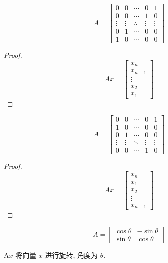 \begin{example}[反转矩阵]
    $$ A=\left[\begin{array}{ccccc}0 & 0 & \cdots & 0 & 1 \\ 0 & 0 & \cdots & 1 & 0 \\ \vdots & \vdots & \therefore & \vdots & \vdots \\ 0 & 1 & \cdots & 0 & 0 \\ 1 & 0 & \cdots & 0 & 0\end{array}\right] $$
\end{example}

\begin{proof}
    $$ A x=\left[\begin{array}{c}x_{n} \\ x_{n-1} \\ \vdots \\ x_{2} \\ x_{1}\end{array}\right] $$
\end{proof}

\begin{example}[循环移位矩阵]
    $$ A=\left[\begin{array}{ccccc}0 & 0 & \cdots & 0 & 1 \\ 1 & 0 & \cdots & 0 & 0 \\ 0 & 1 & \cdots & 0 & 0 \\ \vdots & \vdots & \ddots & \vdots & \vdots \\ 0 & 0 & \cdots & 1 & 0\end{array}\right] $$
\end{example}

\begin{proof}
    $$ A x=\left[\begin{array}{c}x_{n} \\ x_{1} \\ x_{2} \\ \vdots \\ x_{n-1}\end{array}\right] $$
\end{proof}

\begin{example}[旋转矩阵]
    $$ A=\left[\begin{array}{cc}\cos \theta & -\sin \theta \\ \sin \theta & \cos \theta\end{array}\right] $$

    $ \mathrm{A} x $ 将向量 $ x $ 进行旋转, 角度为 $ \theta $.
\end{example}


